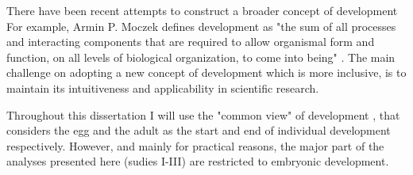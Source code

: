 There have been recent attempts to construct a broader concept of development \citep{Griesemer2014,Moczek2014,Pradeu2014} For example, Armin P. Moczek defines development as "the sum of all processes and interacting components that are required to allow organismal form and function, on all levels of biological organization, to come into being" \citep{Moczek2014}.
%
The main challenge on adopting a new concept of development which is more inclusive, is to maintain its intuitiveness and applicability in scientific research.

Throughout this dissertation I will use the "common view" of development \citep{Minelli2014}, that considers the egg and the adult as the start and end of individual development respectively.
However, and mainly for practical reasons, the major part of the analyses presented here (sudies I-III) are restricted to embryonic development.
